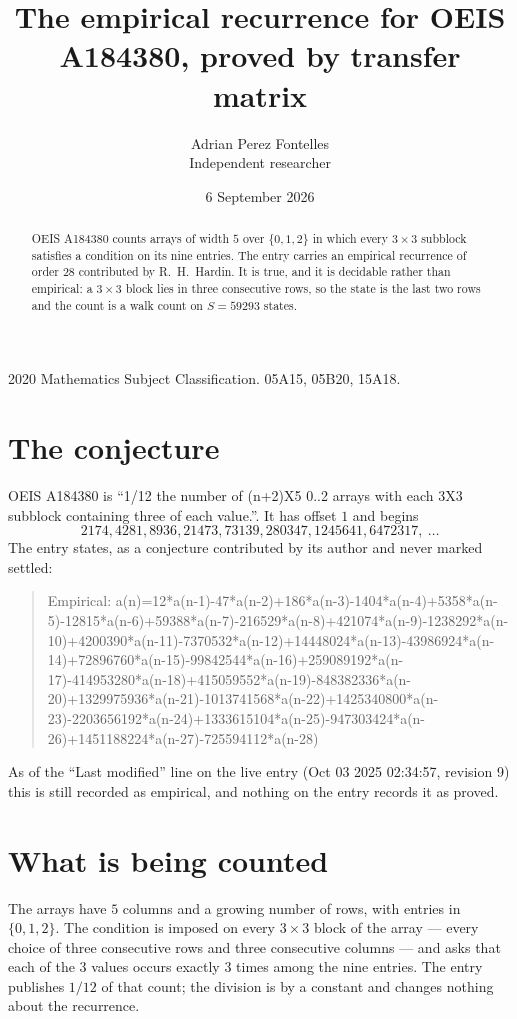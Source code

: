 \documentclass[11pt,a4paper]{article}
\title{The empirical recurrence for OEIS A184380, proved by transfer matrix}
\author{Adrian Perez Fontelles\\ \small Independent researcher}
\date{6 September 2026}
\theoremstyle{plain}
\theoremstyle{definition}
\begin{document}
\maketitle

\begin{abstract}
OEIS A184380 counts arrays of width $5$ over $\{0,1,2\}$ in which every $3\times3$ subblock
satisfies a condition on its nine entries. The entry carries an empirical recurrence of order
$28$ contributed by R.~H.~Hardin. It is true, and it is decidable rather than empirical: a
$3\times3$ block lies in three consecutive rows, so the state is the last two rows and the
count is a walk count on $S=59293$ states.
\end{abstract}

\noindent\small 2020 Mathematics Subject Classification. 05A15, 05B20, 15A18.\normalsize

\section{The conjecture}

OEIS A184380 is ``1/12 the number of (n+2)X5 0..2 arrays with each 3X3 subblock containing three of each value.''. It has offset $1$ and begins
\[
2174, 4281, 8936, 21473, 73139, 280347, 1245641, 6472317,\ \dots
\]
The entry states, as a conjecture contributed by its author and never marked settled:
\begin{quote}
Empirical: a(n)=12*a(n-1)-47*a(n-2)+186*a(n-3)-1404*a(n-4)+5358*a(n-5)-12815*a(n-6)+59388*a(n-7)-216529*a(n-8)+421074*a(n-9)-1238292*a(n-10)+4200390*a(n-11)-7370532*a(n-12)+14448024*a(n-13)-43986924*a(n-14)+72896760*a(n-15)-99842544*a(n-16)+259089192*a(n-17)-414953280*a(n-18)+415059552*a(n-19)-848382336*a(n-20)+1329975936*a(n-21)-1013741568*a(n-22)+1425340800*a(n-23)-2203656192*a(n-24)+1333615104*a(n-25)-947303424*a(n-26)+1451188224*a(n-27)-725594112*a(n-28)
\end{quote}
As of the ``Last modified'' line on the live entry (Oct 03 2025 02:34:57, revision 9) this is still
recorded as empirical, and nothing on the entry records it as proved.

\section{What is being counted}

The arrays have $5$ columns and a growing number of rows, with entries in $\{0,1,2\}$. The
condition is imposed on every $3\times3$ block of the array --- every choice of three
consecutive rows and three consecutive columns --- and asks that each of the $3$ values occurs exactly $3$ times among the nine entries. The entry publishes $1/12$ of that count; the division is by a constant and changes nothing about the recurrence.
\end{document}
